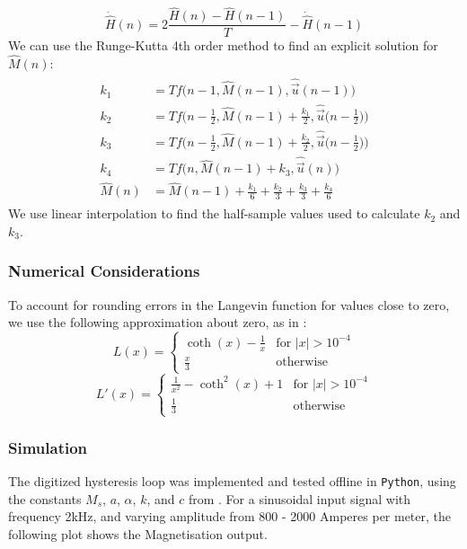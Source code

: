 \documentclass[twoside,a4paper]{article}
\begin{document}
\begin{equation}
    \dot{\hat{H}}(n) = 2\frac{\hat{H}(n) - \hat{H}(n-1)}{T} - \dot{\hat{H}}(n-1)
\end{equation}
%
We can use the Runge-Kutta 4th order method \cite{Yeh} to find an explicit solution
for $\hat{M}(n)$:
\begin{align}
\begin{split}
    k_1 &= T f \Big(n-1, \hat{M}(n-1), \hat{\vec{u}}(n-1) \Big)\\
    k_2 &= T f \Big(n - \frac{1}{2}, \hat{M}(n-1) + \frac{k_1}{2}, \hat{\vec{u}}  \Big(n-\frac{1}{2} \Big) \Big)\\
    k_3 &= T f \Big(n- \frac{1}{2}, \hat{M}(n-1) + \frac{k_2}{2}, \hat{\vec{u}} \Big(n-\frac{1}{2} \Big) \Big)\\
    k_4 &= T f \Big(n, \hat{M}(n-1) + k_3, \hat{\vec{u}}(n) \Big)\\
    \hat{M}(n) &= \hat{M}(n-1) + \frac{k_1}{6} + \frac{k_2}{3} + \frac{k_3}{3} + \frac{k_4}{6}
\end{split}
\end{align}
%
We use linear interpolation to find the half-sample values used to calculate $k_2$ and $k_3$.

\subsubsection{Numerical Considerations}
To account for rounding errors in the Langevin function for values close to 
zero, we use the following approximation about zero, as in \cite{Hysteresis}:
\begin{equation}
    L(x) = \begin{cases}
        \coth(x) - \frac{1}{x} & \text{for $|x| > 10^{-4}$} \\
        \frac{x}{3} & \text{otherwise}
    \end{cases}
\end{equation}
\begin{equation}
    L'(x) = \begin{cases}
        \frac{1}{x^2} - \coth^{2}(x) + 1 & \text{for $|x| > 10^{-4}$} \\
        \frac{1}{3} & \text{otherwise}
    \end{cases}
\end{equation}

\subsubsection{Simulation}
The digitized hysteresis loop was implemented and tested offline
in \texttt{Python}, using the constants $M_s$, $a$, $\alpha$, $k$,
and $c$ from \cite{JilesAtherton1986}. For a sinusoidal input signal
with frequency 2kHz, and varying amplitude from 800 - 2000 Amperes per
meter, the following plot shows the Magnetisation output.
\end{document}
